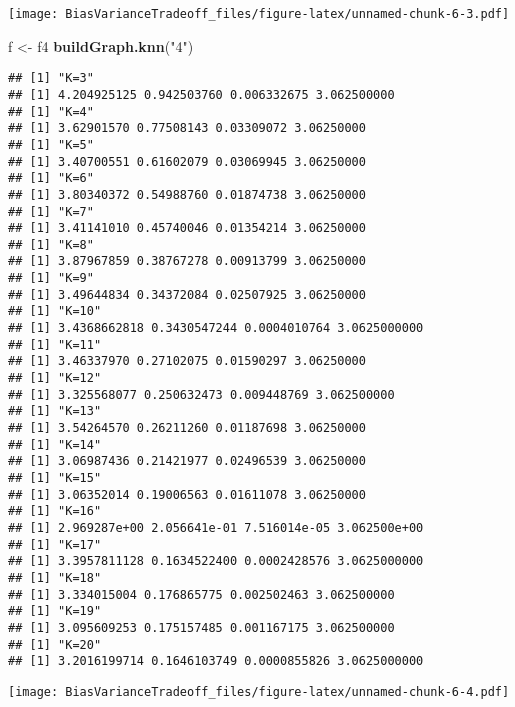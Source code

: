 \documentclass[]{article}
\newenvironment{Shaded}{\begin{snugshade}}{\end{snugshade}}
\newcommand{\KeywordTok}[1]{\textcolor[rgb]{0.13,0.29,0.53}{\textbf{#1}}}
\newcommand{\NormalTok}[1]{#1}
\newcommand{\StringTok}[1]{\textcolor[rgb]{0.31,0.60,0.02}{#1}}
\begin{document}
\texttt{[image: BiasVarianceTradeoff\_files/figure-latex/unnamed-chunk-6-3.pdf]}

\begin{Shaded}
\begin{Highlighting}[]
\NormalTok{f <-}\StringTok{ }\NormalTok{f4}
\KeywordTok{buildGraph.knn}\NormalTok{(}\StringTok{"4"}\NormalTok{)}
\end{Highlighting}
\end{Shaded}

\begin{verbatim}
## [1] "K=3"
## [1] 4.204925125 0.942503760 0.006332675 3.062500000
## [1] "K=4"
## [1] 3.62901570 0.77508143 0.03309072 3.06250000
## [1] "K=5"
## [1] 3.40700551 0.61602079 0.03069945 3.06250000
## [1] "K=6"
## [1] 3.80340372 0.54988760 0.01874738 3.06250000
## [1] "K=7"
## [1] 3.41141010 0.45740046 0.01354214 3.06250000
## [1] "K=8"
## [1] 3.87967859 0.38767278 0.00913799 3.06250000
## [1] "K=9"
## [1] 3.49644834 0.34372084 0.02507925 3.06250000
## [1] "K=10"
## [1] 3.4368662818 0.3430547244 0.0004010764 3.0625000000
## [1] "K=11"
## [1] 3.46337970 0.27102075 0.01590297 3.06250000
## [1] "K=12"
## [1] 3.325568077 0.250632473 0.009448769 3.062500000
## [1] "K=13"
## [1] 3.54264570 0.26211260 0.01187698 3.06250000
## [1] "K=14"
## [1] 3.06987436 0.21421977 0.02496539 3.06250000
## [1] "K=15"
## [1] 3.06352014 0.19006563 0.01611078 3.06250000
## [1] "K=16"
## [1] 2.969287e+00 2.056641e-01 7.516014e-05 3.062500e+00
## [1] "K=17"
## [1] 3.3957811128 0.1634522400 0.0002428576 3.0625000000
## [1] "K=18"
## [1] 3.334015004 0.176865775 0.002502463 3.062500000
## [1] "K=19"
## [1] 3.095609253 0.175157485 0.001167175 3.062500000
## [1] "K=20"
## [1] 3.2016199714 0.1646103749 0.0000855826 3.0625000000
\end{verbatim}

\texttt{[image: BiasVarianceTradeoff\_files/figure-latex/unnamed-chunk-6-4.pdf]}
\end{document}
